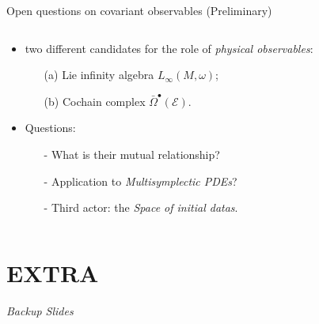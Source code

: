 \documentclass[handout,10pt]{beamer}
\begin{document}
\begin{frame}{Open questions on covariant observables (Preliminary)}
\begin{columns}
\begin{column}{.50\linewidth}
\begin{itemize}
				\item<3-> two different candidates for the role of \emph{physical observables}:
					\begin{itemize}
						\item[(a)] Lie infinity algebra $L_\infty (M,\omega)$;
						\item[(b)] Cochain complex $\bar{\Omega}^\bullet(\mathcal{E})$.
					\end{itemize}
				\item<4-> Questions:
					\begin{itemize}
						\item[-] What is their mutual relationship?
						\item[-] Application to \emph{Multisymplectic PDEs}?
						\item[-] Third actor: the \emph{Space of initial datas}.
					\end{itemize}																		
			\end{itemize}
		\end{column}
	\end{columns}
\end{frame}




  
\appendix
\section{EXTRA}
\begin{frame}
	\begin{center}
	\Huge\emph{Backup Slides}
	\end{center}
\end{frame}
\addtocounter{framenumber}{-1}


\end{document}

